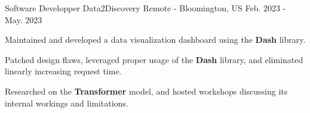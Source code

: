 \begin{cventries}
  \cventry
    {Software Developper} %
    {Data2Discovery} %
    {Remote - Bloomington, US} %
    {Feb. 2023 - May. 2023} %
    {
      \begin{cvitems} %
        \item {Maintained and developed a data visualization dashboard using the \textbf{Dash} library.}
        \item {Patched design flaws, leveraged proper usage of the \textbf{Dash} library, and eliminated linearly increasing request time.}
        \item {Researched on the \textbf{Transformer} model, and hosted workshops discussing its internal workings and limitations.}
      \end{cvitems}
    }

\end{cventries}
